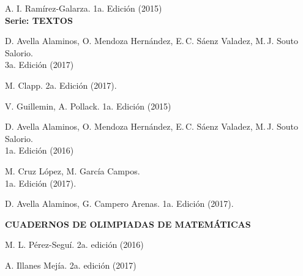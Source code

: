A. I. Ramírez-Galarza. 1a. Edición (2015)\\[10pt]
{\bfseries Serie: TEXTOS}

\vskip3pt %
D. Avella Alaminos, O. Mendoza Hernández, E.\,C. Sáenz Valadez,
M.\,J. Souto Salorio.\\
3a. Edición (2017) 

M. Clapp. 2a. Edición (2017).

V. Guillemin, A. Pollack. 1a. Edición (2015)

D. Avella Alaminos, O. Mendoza Hernández, E.\,C. Sáenz Valadez,
M.\,J. Souto Salorio.\\
1a. Edición (2016) 

M. Cruz López, M. García Campos.\\
1a. Edición (2017).

D. Avella Alaminos, G. Campero Arenas.
1a. Edición (2017).


\vskip10pt 

{\bfseries CUADERNOS DE OLIMPIADAS DE MATEMÁTICAS}

\vskip3pt %
M. L. Pérez-Seguí.
2a. edición (2016) 

A. Illanes Mejía. 
2a. edición (2017)

